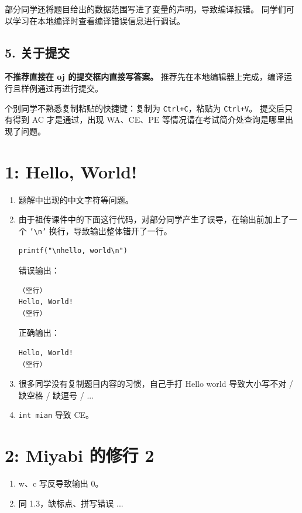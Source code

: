 \documentclass[UTF8]{ctexart}
\newcommand{\code}[1]{\colorbox{gray!10}{\texttt{#1}}}
\begin{document}
部分同学还将题目给出的数据范围写进了变量的声明，导致编译报错。
同学们可以学习在本地编译时查看编译错误信息进行调试。

\subsection*{5. 关于提交}

\textbf{不推荐直接在 oj 的提交框内直接写答案。} 推荐先在本地编辑器上完成，编译运行且样例通过再进行提交。

个别同学不熟悉复制粘贴的快捷键：复制为 \code{Ctrl+C}，粘贴为 \code{Ctrl+V}。
提交后只有得到 AC 才是通过，出现 WA、CE、PE 等情况请在考试简介处查询是哪里出现了问题。

\section*{1: Hello, World!}

\begin{enumerate}
  \item 题解中出现的中文字符等问题。
  \item 由于祖传课件中的下面这行代码，对部分同学产生了误导，在输出前加上了一个 \code{'\textbackslash n'} 换行，导致输出整体错开了一行。

  \begin{lstlisting}
printf("\nhello, world\n")
  \end{lstlisting}

  错误输出：

  \begin{lstlisting}
（空行）
Hello, World!
（空行）
  \end{lstlisting}

  正确输出：

  \begin{lstlisting}
Hello, World!
（空行）
  \end{lstlisting}

  \item 很多同学没有复制题目内容的习惯，自己手打 Hello world 导致大小写不对 / 缺空格 / 缺逗号 / ...
  \item \code{int mian} 导致 CE。
\end{enumerate}

\section*{2: Miyabi 的修行 2}

\begin{enumerate}
  \item w、c 写反导致输出 0。
  \item 同 1.3，缺标点、拼写错误 ...
\end{enumerate}
\end{document}
